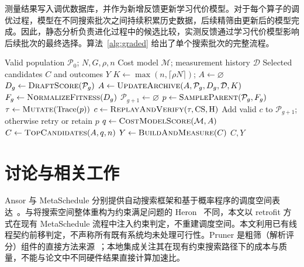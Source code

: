 \documentclass[11pt,twocolumn]{ctexart}
\begin{document}
测量结果写入调优数据库，并作为新增反馈更新学习代价模型。对于每个算子的调优过程，模型在不同搜索批次之间持续积累历史数据，后续精筛由更新后的模型完成。因此，静态分析负责进化过程中的候选比较，实测反馈通过学习代价模型影响后续批次的最终选择。算法~\ref{alg:graded} 给出了单个搜索批次的完整流程。

\begin{algorithm}[!tb]
\caption{Draft-guided candidate selection}
\label{alg:graded}
\footnotesize
\begin{algorithmic}[1]
\Require Valid population $\mathcal P_0$; $N,G,\rho,n$
\Require Cost model $\mathcal M$; measurement history $\mathcal D$
\Ensure Selected candidates $C$ and outcomes $Y$
\State $K\gets\max(n,\lceil\rho N\rceil)$; $A\gets\varnothing$
    \State $D_g\gets\Call{DraftScore}{\mathcal P_g}$
    \State $A\gets\Call{UpdateArchive}{A,\mathcal P_g,D_g,\mathcal D,K}$
        \State $F_g\gets\Call{NormalizeFitness}{D_g}$
        \State $\mathcal P_{g+1}\gets\varnothing$
            \State $p\gets\Call{SampleParent}{\mathcal P_g,F_g}$
            \State $\tau\gets\Call{Mutate}{\operatorname{Trace}(p)}$
            \State $c\gets\Call{ReplayAndVerify}{\tau,\mathrm{CS},\mathrm{H}}$
            \State Add valid $c$ to $\mathcal P_{g+1}$;
            \Statex \hspace{\algorithmicindent}\hspace{\algorithmicindent}\hspace{\algorithmicindent} otherwise retry or retain $p$
        \EndWhile
    \EndIf
\EndFor
\State $q\gets\Call{CostModelScore}{\mathcal M,A}$
\State $C\gets\Call{TopCandidates}{A,q,n}$
\State $Y\gets\Call{BuildAndMeasure}{C}$
\State {}
\State \Return $C,Y$
\end{algorithmic}
\end{algorithm}

\FloatBarrier


\section{讨论与相关工作}
\label{sec:related}
Ansor 与 MetaSchedule 分别提供自动搜索框架和基于概率程序的调度空间表达~\cite{ansor,metaschedule}。与将搜索空间整体重构为约束满足问题的 Heron~\cite{heron} 不同，本文以 retrofit 方式在现有 MetaSchedule 流程中注入约束判定，不重建调度空间。本文利用已有线程契约前移判定，不声称所有既有系统均未处理可行性。Pruner 是粗筛（解析评分）组件的直接方法来源~\cite{pruner}；本地集成关注其在现有约束搜索路径下的成本与质量，不能与论文中不同硬件结果直接计算加速比。
\end{document}
